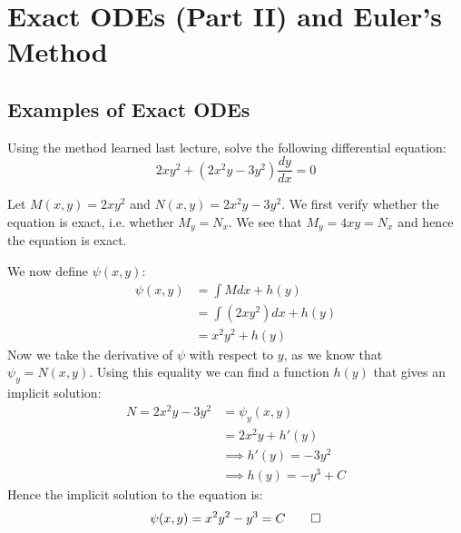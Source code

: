 \section{Exact ODEs (Part II) and Euler's Method}

\subsection{Examples of Exact ODEs}

\begin{example}
   Using the method learned last lecture, solve the following differential equation:
   \[ 2xy^2 + (2x^2y - 3y^2)\frac{dy}{dx} = 0 \]
\end{example}
\begin{solution}
   Let $M(x,y) = 2xy^2$ and $N(x,y) = 2x^2y - 3y^2$. We first verify whether the equation is exact, i.e. whether $M_y = N_x$. We see that $M_y = 4xy = N_x$ and hence the equation is exact. 

   We now define $\psi(x,y)$:
   \begin{align*}
      \psi(x,y) &= \int M dx + h(y) \\
               &=  \int (2xy^2)dx + h(y) \\
               &=  x^2y^2 + h(y)
   \end{align*}
   Now we take the derivative of $\psi$ with respect to $y$, as we know that $\psi_y = N(x,y)$. Using this equality we can find a function $h(y)$ that gives an implicit solution:
   \begin{align*}
      N = 2x^2y - 3y^2 &= \psi_y(x,y) \\
                       &= 2x^2y + h'(y) \\
                       &\implies h'(y) = -3y^2 \\
                       &\implies h(y) = -y^3 + C
   \end{align*}  
   Hence the implicit solution to the equation is:
   \[ \psi(x,y) = x^2y^2 -y^3 = C \qedhere\]
\end{solution}

